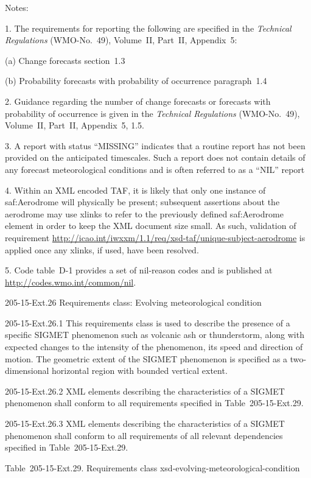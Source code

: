 Notes:

1. The requirements for reporting the following are specified in the \emph{Technical Regulations} (WMO-No.~49), Volume~II, Part~II, Appendix~5:

(a) Change forecasts section~1.3

(b) Probability forecasts with probability of occurrence paragraph~1.4

2. Guidance regarding the number of change forecasts or forecasts with probability of occurrence is given in the \emph{Technical Regulations} (WMO-No.~49), Volume~II, Part~II, Appendix~5, 1.5.

3. A report with status ``MISSING'' indicates that a routine report has not been provided on the anticipated timescales. Such a report does not contain details of any forecast meteorological conditions and is often referred to as a ``NIL'' report

4. Within an XML encoded TAF, it is likely that only one instance of saf:Aerodrome will physically be present; subsequent assertions about the aerodrome may use xlinks to refer to the previously defined saf:Aerodrome element in order to keep the XML document size small. As such, validation of requirement \url{http://icao.int/iwxxm/1.1/req/xsd-taf/unique-subject-aerodrome} is applied once any xlinks, if used, have been resolved.

5. Code table~D-1 provides a set of nil-reason codes and is published at \url{http://codes.wmo.int/common/nil}.

205-15-Ext.26 Requirements class: Evolving meteorological condition

205-15-Ext.26.1 This requirements class is used to describe the presence of a specific SIGMET phenomenon such as volcanic ash or thunderstorm, along with expected changes to the intensity of the phenomenon, its speed and direction of motion. The geometric extent of the SIGMET phenomenon is specified as a two-dimensional horizontal region with bounded vertical extent.

205-15-Ext.26.2 XML elements describing the characteristics of a SIGMET phenomenon shall conform to all requirements specified in Table~205-15-Ext.29.

205-15-Ext.26.3 XML elements describing the characteristics of a SIGMET phenomenon shall conform to all requirements of all relevant dependencies specified in Table~205-15-Ext.29.

Table~205-15-Ext.29. Requirements class xsd-evolving-meteorological-condition

